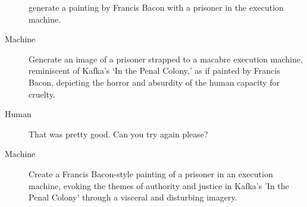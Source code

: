 \begin{description}
    generate a painting by Francis Bacon with a prisoner in the execution machine.
\item[Machine] \openfatdquo{}Generate an image of a prisoner strapped to a
    macabre execution machine, reminiscent of Kafka's `In the Penal Colony,' as
    if painted by Francis Bacon, depicting the horror and absurdity of the human
    capacity for cruelty.\closefatdquo
\item[Human] That was pretty good. Can you try again please?
\item[Machine] \openfatdquo{}Create a Francis Bacon-style painting of a prisoner
    in an execution machine, evoking the themes of authority and justice in
    Kafka's 'In the Penal Colony' through a visceral and disturbing
    imagery.\closefatdquo
\end{description}
